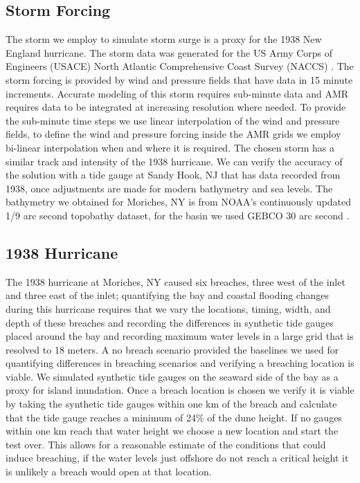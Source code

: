 \documentclass{coastal_paper}
\begin{document}
\subsection*{Storm Forcing}
The storm we employ to simulate storm surge is a proxy for the 1938 New England hurricane. The storm data was generated for the US Army Corps of Engineers (USACE) North Atlantic Comprehensive Coast Survey (NACCS) \citep{cialone2015north}. The storm forcing is provided by wind and pressure fields that have data in 15 minute increments. Accurate modeling of this storm requires sub-minute data and AMR requires data to be integrated at increasing resolution where needed. To provide the sub-minute time steps we use linear interpolation of the wind and pressure fields, to define the wind and pressure forcing inside the AMR grids we employ bi-linear interpolation when and where it is required. The chosen storm has a similar track and intensity of the 1938 hurricane. We can verify the accuracy of the solution with a tide gauge at Sandy Hook, NJ that has data recorded from 1938, once adjustments are made for modern bathymetry and sea levels. The bathymetry we obtained for Moriches, NY is from NOAA's continuously updated 1/9 arc second topobathy dataset, for the basin we used GEBCO 30 arc second \citep{cires2014continuously, weatherall2015new}.

\subsection*{1938 Hurricane}
The 1938 hurricane at Moriches, NY caused six breaches, three west of the inlet and three east of the inlet; quantifying the bay and coastal flooding changes during this hurricane requires that we vary the locations, timing, width, and depth of these breaches and recording the differences in synthetic tide gauges placed around the bay and recording maximum water levels in a large grid that is resolved to 18 meters. A no breach scenario provided the baselines we used for quantifying differences in breaching scenarios and verifying a breaching location is viable. We simulated synthetic tide gauges on the seaward side of the bay as a proxy for island inundation. Once a breach location is chosen we verify it is viable by taking the synthetic tide gauges within one km of the breach and calculate that the tide gauge reaches a minimum of 24\% of the dune height. If no gauges within one km reach that water height we choose a new location and start the test over. This allows for a reasonable estimate of the conditions that could induce breaching, if the water levels just offshore do not reach a critical height it is unlikely a breach would open at that location.
\end{document}
